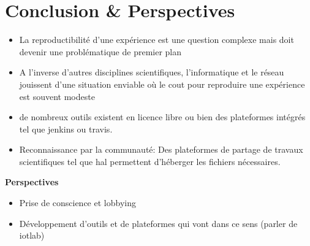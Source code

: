 \section{Conclusion \& Perspectives} %
\label{sec:conclusion}

\begin{itemize}

  \item La reproductibilité d'une expérience est une question complexe mais
    doit devenir une problématique de premier plan

  \item A l'inverse d'autres disciplines scientifiques, l'informatique et le
    réseau jouissent d'une situation enviable où le cout pour reproduire une
    expérience est souvent modeste

  \item de nombreux outils existent en licence libre ou bien des plateformes
    intégrés tel que jenkins ou travis.

  \item Reconnaissance par la communauté: Des plateformes de partage de travaux
    scientifiques tel que hal permettent d'héberger les fichiers nécessaires.

\end{itemize}

\textbf{Perspectives}

\begin{itemize}

  \item Prise de conscience et lobbying
  
  \item Développement d'outils et de plateformes qui vont dans ce sens (parler
    de iotlab)

\end{itemize}


